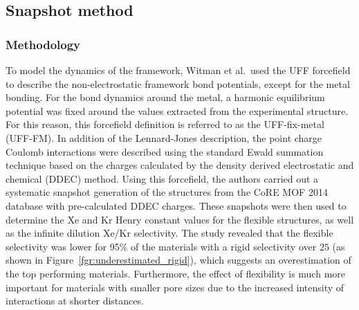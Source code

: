 \documentclass[main]{subfiles}
\begin{document}
\subsection{Snapshot method}

\subsubsection{Methodology}

To model the dynamics of the framework, Witman et al.\ used the UFF forcefield to describe the non-electrostatic framework bond potentials, except for the metal bonding. For the bond dynamics around the metal, a harmonic equilibrium potential was fixed around the values extracted from the experimental structure. For this reason, this forcefield definition is referred to as the UFF-fix-metal (UFF-FM). In addition of the Lennard-Jones description, the point charge Coulomb interactions were described using the standard Ewald summation technique based on the charges calculated by the density derived electrostatic and chemical (DDEC) method.\autocite{manz2010chemically} Using this forcefield, the authors carried out a systematic snapshot generation of the structures from the CoRE MOF 2014 database with pre-calculated DDEC charges. These snapshots were then used to determine the Xe and Kr Henry constant values for the flexible structures, as well as the infinite dilution Xe/Kr selectivity. The study revealed that the flexible selectivity was lower for {95\%} of the materials with a rigid selectivity over $25$ (as shown in Figure~\ref{fgr:underestimated_rigid}), which suggests an overestimation of the top performing materials. Furthermore, the effect of flexibility is much more important for materials with smaller pore sizes due to the increased intensity of interactions at shorter distances.
\end{document}
